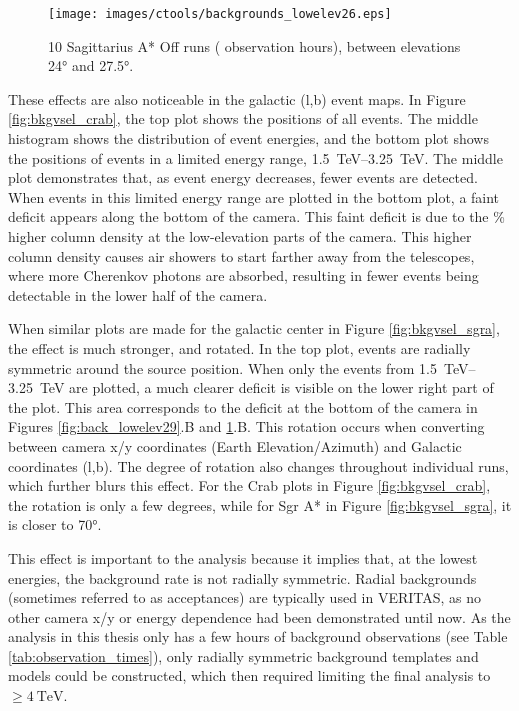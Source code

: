     \begin{figure}[ht]
      \centering
      \texttt{[image: images/ctools/backgrounds\_lowelev26.eps]}
      \caption[CTOOLS Background at \ang{26} Elevation]{
        10 Sagittarius A* Off runs ( observation hours), between elevations \ang{24} and \ang{27.5}. 
      }
      \label{fig:back_lowelev26}
    \end{figure}
  
  These effects are also noticeable in the galactic (l,b) event maps.
  In Figure \ref{fig:bkgvsel_crab}, the top plot shows the positions of all events.
  The middle histogram shows the distribution of event energies, and the bottom plot shows the positions of events in a limited energy range, \SIrange{1.5}{3.25}{\TeV}.
  The middle plot demonstrates that, as event energy decreases, fewer events are detected.
  When events in this limited energy range are plotted in the bottom plot, a faint deficit appears along the bottom of the camera.
  This faint deficit is due to the \% higher column density at the low-elevation parts of the camera.
  This higher column density causes air showers to start farther away from the telescopes, where more Cherenkov photons are absorbed, resulting in fewer events being detectable in the lower half of the camera.

  When similar plots are made for the galactic center in Figure \ref{fig:bkgvsel_sgra}, the effect is much stronger, and rotated.
  In the top plot, events are radially symmetric around the source position.
  When only the events from \SIrange{1.5}{3.25}{\TeV} are plotted, a much clearer deficit is visible on the lower right part of the plot.
  This area corresponds to the deficit at the bottom of the camera in Figures \ref{fig:back_lowelev29}.B and \ref{fig:back_lowelev26}.B.
  This rotation occurs when converting between camera x/y coordinates (Earth Elevation/Azimuth) and Galactic coordinates (l,b).
  The degree of rotation also changes throughout individual runs, which further blurs this effect.
  For the Crab plots in Figure \ref{fig:bkgvsel_crab}, the rotation is only a few degrees, while for Sgr A* in Figure \ref{fig:bkgvsel_sgra}, it is closer to \ang{70}.
  
  This effect is important to the analysis because it implies that, at the lowest energies, the background rate is not radially symmetric.
  Radial backgrounds (sometimes referred to as acceptances) are typically used in VERITAS, as no other camera x/y or energy dependence had been demonstrated until now.
  As the analysis in this thesis only has a few hours of background observations (see Table \ref{tab:observation_times}), only radially symmetric background templates and models could be constructed, which then required limiting the final analysis to $\geq\SI{4}{\TeV}$.
  
